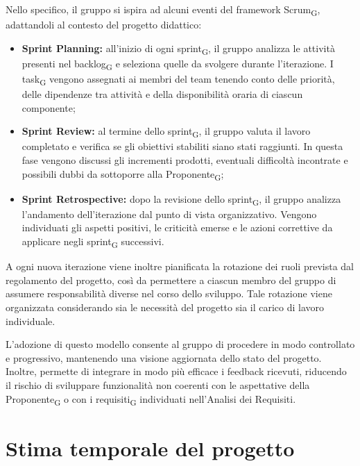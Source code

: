 \documentclass[a4paper, 10pt, colorlinks=true, linkcolor=black, urlcolor=blue, citecolor=blue, hidelinks]{article}
\begin{document}
Nello specifico, il gruppo si ispira ad alcuni eventi del framework Scrum\textsubscript{G}, adattandoli al contesto del progetto didattico:

\begin{itemize}
    \item \textbf{Sprint Planning:} all'inizio di ogni sprint\textsubscript{G}, il gruppo analizza le attività presenti nel backlog\textsubscript{G} e seleziona quelle da svolgere durante l'iterazione. I task\textsubscript{G} vengono assegnati ai membri del team tenendo conto delle priorità, delle dipendenze tra attività e della disponibilità oraria di ciascun componente;

    \item \textbf{Sprint Review:} al termine dello sprint\textsubscript{G}, il gruppo valuta il lavoro completato e verifica se gli obiettivi stabiliti siano stati raggiunti. In questa fase vengono discussi gli incrementi prodotti, eventuali difficoltà incontrate e possibili dubbi da sottoporre alla Proponente\textsubscript{G};

    \item \textbf{Sprint Retrospective:} dopo la revisione dello sprint\textsubscript{G}, il gruppo analizza l'andamento dell'iterazione dal punto di vista organizzativo. Vengono individuati gli aspetti positivi, le criticità emerse e le azioni correttive da applicare negli sprint\textsubscript{G} successivi.
\end{itemize}

A ogni nuova iterazione viene inoltre pianificata la rotazione dei ruoli prevista dal regolamento del progetto, così da permettere a ciascun membro del gruppo di assumere responsabilità diverse nel corso dello sviluppo. Tale rotazione viene organizzata considerando sia le necessità del progetto sia il carico di lavoro individuale.

L'adozione di questo modello consente al gruppo di procedere in modo controllato e progressivo, mantenendo una visione aggiornata dello stato del progetto. Inoltre, permette di integrare in modo più efficace i feedback ricevuti, riducendo il rischio di sviluppare funzionalità non coerenti con le aspettative della Proponente\textsubscript{G} o con i requisiti\textsubscript{G} individuati nell'Analisi dei Requisiti.

\section{Stima temporale del progetto}
\end{document}
